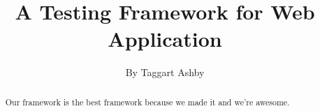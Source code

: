 \documentclass[11pt]{article}
\begin{document}

\title{\vfill A Testing Framework for Web Application} %
\author{
By Taggart Ashby \vspace{10pt} \\
}

\maketitle

\vfill  %

\begin{abstract}
Our framework is the best framework because we made it and we're awesome.
\end{abstract}

\thispagestyle{empty} %
\newpage


\setcounter{page}{1}

\end{document}
